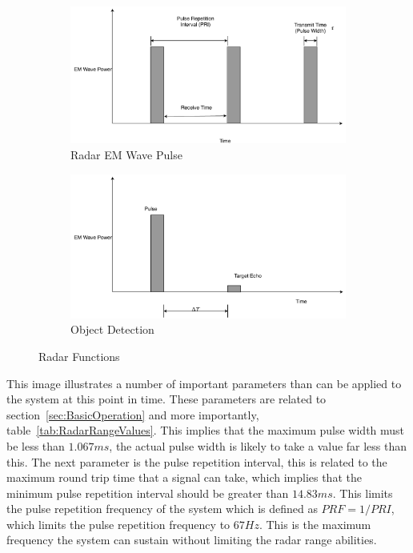 \documentclass[11pt]{witseiepaper}
\begin{document}
\begin{figure}[htb]
    \centering
    \begin{subfigure}{.5\textwidth}
        \centering
            \includegraphics[width=0.9\linewidth]{Pulsing.pdf}
            \caption{Radar EM Wave Pulse}
            \label{fig:Pulsing}
        \end{subfigure}%
        \begin{subfigure}{.5\textwidth}
            \centering
            \includegraphics[width=0.9\linewidth]{ObjectDetection.pdf}
            \caption{Object Detection}
                \label{fig:ObjectDetection}
            \end{subfigure}
\caption{Radar Functions}
\label{fig:RadarFunctions}
\end{figure}



This image illustrates a number of important parameters than can be applied to the system at this point in time. These parameters are related to section~\ref{sec:BasicOperation} and more importantly, table~\ref{tab:RadarRangeValues}. This implies that the maximum pulse width must be less than $1.067 ms$, the actual pulse width is likely to take a value far less than this. 
The next parameter is the pulse repetition interval, this is related to the maximum round trip time that a signal can take, which implies that the minimum pulse repetition interval should be greater than $14.83 ms$. This limits the pulse repetition frequency of the system which is defined as $PRF = 1/PRI$, which limits the pulse repetition frequency to $67 Hz$. This is the maximum frequency the system can sustain without limiting the radar range abilities.
\end{document}
